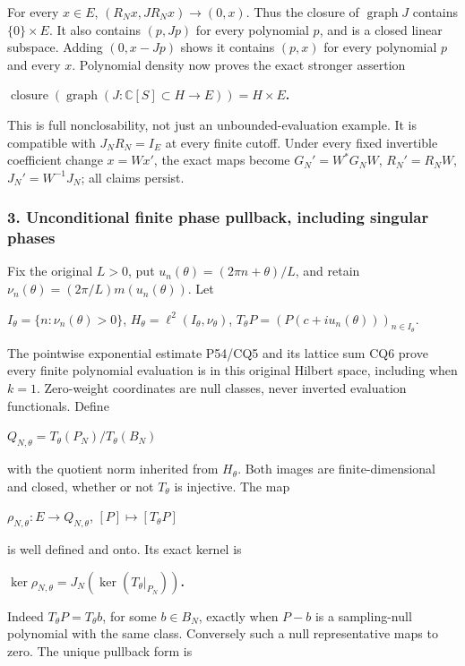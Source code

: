 For every \(x\in E\), \((R_Nx,JR_Nx)\longrightarrow(0,x)\). Thus the closure of \(\operatorname{graph}J\) contains \(\{0\}\times E\). It also contains \((p,Jp)\) for every polynomial \(p\), and is a closed linear subspace. Adding \((0,x-Jp)\) shows it contains \((p,x)\) for every polynomial \(p\) and every \(x\). Polynomial density now proves the exact stronger assertion

\textbf{\(\operatorname{closure}(\operatorname{graph}(J:\mathbb C[S]\subset H\longrightarrow E))=H\times E\).}

This is full nonclosability, not just an unbounded-evaluation example. It is compatible with \(J_NR_N=I_E\) at every finite cutoff. Under every fixed invertible coefficient change \(x=Wx'\), the exact maps become \(G_N'=W^*G_NW\), \(R_N'=R_NW\), \(J_N'=W^{-1}J_N\); all claims persist.

\subsubsection{3. Unconditional finite phase pullback, including singular phases}\label{unconditional-finite-phase-pullback-including-singular-phases}

Fix the original \(L>0\), put \(u_n(\theta)=(2\pi n+\theta)/L\), and retain \(\nu_n(\theta)=(2\pi/L)m(u_n(\theta))\). Let

\(I_\theta=\{n:\nu_n(\theta)>0\}\), \(H_\theta=\ell^2(I_\theta,\nu_\theta)\), \(T_\theta P=(P(c+iu_n(\theta)))_{n\in I_\theta}\).

The pointwise exponential estimate P54/CQ5 and its lattice sum CQ6 prove every finite polynomial evaluation is in this original Hilbert space, including when \(k=1\). Zero-weight coordinates are null classes, never inverted evaluation functionals. Define

\(Q_{N,\theta}=T_\theta(P_N)/T_\theta(B_N)\)

with the quotient norm inherited from \(H_\theta\). Both images are finite-dimensional and closed, whether or not \(T_\theta\) is injective. The map

\(\rho_{N,\theta}:E\longrightarrow Q_{N,\theta}\), \([P]\longmapsto[T_\theta P]\)

is well defined and onto. Its exact kernel is

\textbf{\(\ker\rho_{N,\theta}=J_N(\ker(T_\theta|_{P_N}))\).}

Indeed \(T_\theta P=T_\theta b\), for some \(b\in B_N\), exactly when \(P-b\) is a sampling-null polynomial with the same class. Conversely such a null representative maps to zero. The unique pullback form is

